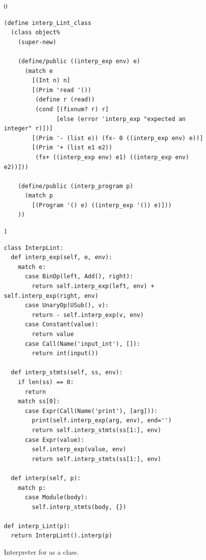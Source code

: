 \documentclass[7x10,nocrop]{TimesAPriori_MIT}%
\def\racketEd{0}
\def\pythonEd{1}
\def\edition{1}
\begin{document}
\begin{figure}[tp]
{\if\edition\racketEd
\begin{lstlisting}
(define interp_Lint_class
  (class object%
    (super-new)
    
    (define/public ((interp_exp env) e)
      (match e
        [(Int n) n]
        [(Prim 'read '())
         (define r (read))
         (cond [(fixnum? r) r]
               [else (error 'interp_exp "expected an integer" r)])]
        [(Prim '- (list e)) (fx- 0 ((interp_exp env) e))]
        [(Prim '+ (list e1 e2))
         (fx+ ((interp_exp env) e1) ((interp_exp env) e2))]))

    (define/public (interp_program p)
      (match p
        [(Program '() e) ((interp_exp '()) e)]))
    ))
\end{lstlisting}
\fi}
{\if\edition\pythonEd
\begin{lstlisting}
class InterpLint:
  def interp_exp(self, e, env):
    match e:
      case BinOp(left, Add(), right):
        return self.interp_exp(left, env) + self.interp_exp(right, env)
      case UnaryOp(USub(), v):
        return - self.interp_exp(v, env)
      case Constant(value):
        return value
      case Call(Name('input_int'), []):
        return int(input())            

  def interp_stmts(self, ss, env):
    if len(ss) == 0:
      return
    match ss[0]:
      case Expr(Call(Name('print'), [arg])):
        print(self.interp_exp(arg, env), end='')
        return self.interp_stmts(ss[1:], env)
      case Expr(value):
        self.interp_exp(value, env)
        return self.interp_stmts(ss[1:], env)

  def interp(self, p):
    match p:
      case Module(body):
        self.interp_stmts(body, {})

def interp_Lint(p):
  return InterpLint().interp(p)
\end{lstlisting}
\fi}
\caption{Interpreter for \LangInt{} as a class.}
\label{fig:interp-Lint-class}
\end{figure}
\end{document}

